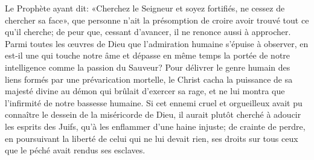 Le Prophète ayant dit:
	«Cherchez le Seigneur et soyez fortifiés, ne cessez de chercher sa face»,
	que personne n’ait la présomption
		de croire avoir trouvé tout ce qu’il cherche;
	de peur que, cessant d’avancer, il ne renonce aussi à approcher.
Parmi toutes les œuvres de Dieu que l’admiration humaine s’épuise à observer,
	en est-il une qui touche notre âme
	et dépasse en même temps la portée de notre intelligence
	comme la passion du Sauveur?
Pour délivrer le genre humain des liens formés par une prévarication mortelle,
	le Christ cacha la puissance de sa majesté divine
	au démon qui brûlait d’exercer sa rage,
	et ne lui montra que l’infirmité de notre bassesse humaine.
Si cet ennemi cruel et orgueilleux
	avait pu connaître le dessein de la miséricorde de Dieu,
	il aurait plutôt cherché à adoucir les esprits des Juifs,
	qu’à les enflammer d’une haine injuste;
	de crainte de perdre,
		en poursuivant la liberté de celui qui ne lui devait rien,
	ses droits sur tous ceux que le péché avait rendus ses esclaves.
